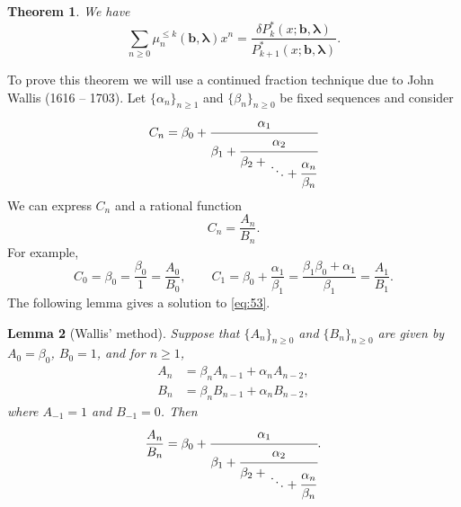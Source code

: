 \documentclass[oneside]{book}
\numberwithin{equation}{section}
\newtheorem{thm}{Theorem}[section]
\newtheorem{lem}[thm]{Lemma}
\theoremstyle{definition}
\renewcommand\vec[1]{\bm{#1}}
\newcommand\vb{\vec{b}}
\newcommand\vla{\vec{\lambda}}
\begin{document}
\begin{thm}\label{thm:15}
  We have
  \[
    \sum_{n\ge0} \mu^{\le k}_n(\vb,\vla) x^n = \frac{\delta P^*_k(x;\vb,\vla)}{P^*_{k+1}(x;\vb,\vla)}.
  \]
\end{thm}

To prove this theorem we will use a continued fraction technique due
to John Wallis (1616 -- 1703). Let \( \{ \alpha_n\}_{n\ge 1} \) and
\( \{ \beta_n\}_{n\ge 0} \) be fixed sequences and consider
\[
  C_n=\beta_0+\cfrac{\alpha_1}{
    \beta_1 + \cfrac{\alpha_2}{
      \beta_2 \displaystyle+ \genfrac{}{}{0pt}{0}{}{\ddots + \cfrac{\alpha_n}{\beta_n}}}}
\]
We can express \( C_n \) and a rational function
\begin{equation}\label{eq:53}
  C_n = \frac{A_n}{B_n}.
\end{equation}
For example,
\begin{equation}\label{eq:52}
C_0  = \beta_0 = \frac{\beta_0}{1} = \frac{A_0}{B_0}, \qquad 
C_1  = \beta_0+ \frac{\alpha_1}{\beta_1} = \frac{\beta_1\beta_0+\alpha_1}{\beta_1} = \frac{A_1}{B_1}.
\end{equation}
The following lemma gives a solution to \eqref{eq:53}.

\begin{lem}[Wallis' method]\label{lem:5}
  Suppose that \( \{A_n\}_{n\ge 0} \) and \( \{B_n\}_{n\ge 0} \) are
  given by \( A_0=\beta_0 \), \( B_0=1 \), and for \( n\ge1 \),
  \begin{align*}
    A_n &= \beta_n A_{n-1} + \alpha_n A_{n-2},\\
    B_n &= \beta_n B_{n-1} + \alpha_n B_{n-2},
  \end{align*}
  where \( A_{-1} = 1 \) and \( B_{-1} = 0 \). Then
  \begin{equation}\label{eq:54}
    \frac{A_n}{B_n} =\beta_0+\cfrac{\alpha_1}{
    \beta_1 + \cfrac{\alpha_2}{
      \beta_2 \displaystyle+ \genfrac{}{}{0pt}{0}{}{\ddots + \cfrac{\alpha_n}{\beta_n}}}}.
  \end{equation}
\end{lem}
\end{document}

